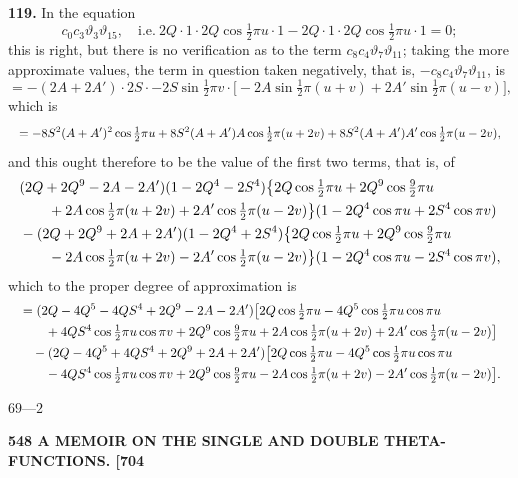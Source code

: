 \documentclass[11pt]{article}
\begin{document}
\medskip
\textbf{119.} In the equation
\[
c_0c_3\vartheta_3\vartheta_{15},\quad\text{i.e.}\ 2Q\cdot 1\cdot 2Q\cos\tfrac{1}{2}\pi u\cdot 1 - 2Q\cdot 1\cdot 2Q\cos\tfrac{1}{2}\pi u\cdot 1 = 0;
\]
this is right, but there is no verification as to the term $c_8c_4\vartheta_7\vartheta_{11}$; taking the more approximate values, the term in question taken negatively, that is, $-c_8c_4\vartheta_7\vartheta_{11}$, is
\[
= -(2A + 2A')\cdot 2S\cdot -2S\sin\tfrac{1}{2}\pi v\cdot\bigl[-2A\sin\tfrac{1}{2}\pi(u+v) + 2A'\sin\tfrac{1}{2}\pi(u-v)\bigr],
\]
which is
\[
\resizebox{\textwidth}{!}{$\displaystyle
= -8S^2(A+A')^2\cos\tfrac{1}{2}\pi u + 8S^2(A+A')A\cos\tfrac{1}{2}\pi(u+2v) + 8S^2(A+A')A'\cos\tfrac{1}{2}\pi(u-2v),
$}
\]
and this ought therefore to be the value of the first two terms, that is, of
\[
\resizebox{\textwidth}{!}{$\displaystyle
\begin{aligned}
& (2Q + 2Q^9 - 2A - 2A')(1 - 2Q^4 - 2S^4)\bigl\{2Q\cos\tfrac{1}{2}\pi u + 2Q^9\cos\tfrac{9}{2}\pi u\\
& \qquad + 2A\cos\tfrac{1}{2}\pi(u+2v) + 2A'\cos\tfrac{1}{2}\pi(u-2v)\bigr\}(1 - 2Q^4\cos\pi u + 2S^4\cos\pi v)\\
& - (2Q + 2Q^9 + 2A + 2A')(1 - 2Q^4 + 2S^4)\bigl\{2Q\cos\tfrac{1}{2}\pi u + 2Q^9\cos\tfrac{9}{2}\pi u\\
& \qquad - 2A\cos\tfrac{1}{2}\pi(u+2v) - 2A'\cos\tfrac{1}{2}\pi(u-2v)\bigr\}(1 - 2Q^4\cos\pi u - 2S^4\cos\pi v),
\end{aligned}
$}
\]
which to the proper degree of approximation is
\[
\resizebox{\textwidth}{!}{$\displaystyle
\begin{aligned}
&= (2Q - 4Q^5 - 4QS^4 + 2Q^9 - 2A - 2A')\bigl[2Q\cos\tfrac{1}{2}\pi u - 4Q^5\cos\tfrac{1}{2}\pi u\cos\pi u\\
& \qquad + 4QS^4\cos\tfrac{1}{2}\pi u\cos\pi v + 2Q^9\cos\tfrac{9}{2}\pi u + 2A\cos\tfrac{1}{2}\pi(u+2v) + 2A'\cos\tfrac{1}{2}\pi(u-2v)\bigr]\\
&\quad - (2Q - 4Q^5 + 4QS^4 + 2Q^9 + 2A + 2A')\bigl[2Q\cos\tfrac{1}{2}\pi u - 4Q^5\cos\tfrac{1}{2}\pi u\cos\pi u\\
& \qquad - 4QS^4\cos\tfrac{1}{2}\pi u\cos\pi v + 2Q^9\cos\tfrac{9}{2}\pi u - 2A\cos\tfrac{1}{2}\pi(u+2v) - 2A'\cos\tfrac{1}{2}\pi(u-2v)\bigr].
\end{aligned}
$}
\]

\hfill $69$---$2$

\newpage
\noindent\textbf{548 \hfill A MEMOIR ON THE SINGLE AND DOUBLE THETA-FUNCTIONS. \hfill [704}
\end{document}
